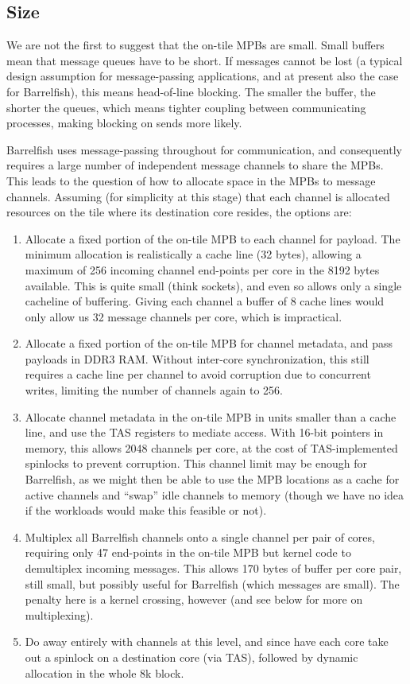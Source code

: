 \documentclass[a4paper,twoside]{report} %
\begin{document}
\subsection{Size}

We are not the first to suggest that the on-tile MPBs are small. Small
buffers mean that message queues have to be short.  If messages cannot
be lost (a typical design assumption for message-passing applications,
and at present also the case for Barrelfish), this means head-of-line
blocking.  The smaller the buffer, the  shorter the queues, which
means tighter coupling between communicating processes, making
blocking on sends more likely. 

Barrelfish uses message-passing throughout for communication, and
consequently requires a large number of independent message channels
to share the MPBs.   This leads to the question of how to allocate
space in the MPBs to message channels.  Assuming (for simplicity at
this stage) that each channel is allocated resources on the tile where
its destination core resides, the options are:

\begin{enumerate}
\item Allocate a fixed portion of the on-tile MPB to each channel for
  payload.  The minimum allocation is realistically a cache line (32
  bytes), allowing a maximum of 256 incoming channel end-points per
  core in the 8192 bytes available.   This is quite small (think
  sockets), and even so allows only a single cacheline of buffering.
  Giving each channel a buffer of 8 cache lines would only allow us 32
  message channels per core, which is impractical. 
\item Allocate a fixed portion of the on-tile MPB for channel
  metadata, and pass payloads in DDR3 RAM.   Without inter-core
  synchronization, this still requires a cache line per channel to
  avoid corruption due to concurrent writes, limiting the number of
  channels again to 256. 
\item Allocate channel metadata in the on-tile MPB in units smaller
  than a cache line, and use the TAS registers to mediate access.
  With 16-bit pointers in memory, this allows 2048 channels per core,
  at the cost of TAS-implemented spinlocks to prevent corruption.
  This channel limit may be enough for Barrelfish, as we might then be
  able to use the MPB locations as a cache for active channels and
  ``swap'' idle channels to memory (though we have no idea if the
  workloads would make this feasible or not). 
\item Multiplex all Barrelfish channels onto a single channel per pair
  of cores, requiring only 47 end-points in the on-tile MPB but kernel
  code to demultiplex incoming messages.  This allows 170 bytes of
  buffer per core pair, still small, but possibly useful for
  Barrelfish (which messages are small).  The penalty here is a kernel
  crossing, however (and see below for more on multiplexing). 
\item Do away entirely with channels at this level, and since have
  each core take out a spinlock on a destination core (via TAS),
  followed by dynamic allocation in the whole 8k block.  
\end{enumerate}
\end{document}
